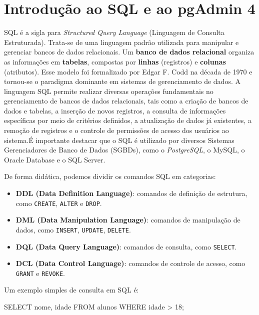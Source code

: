 
\chapter{Introdução ao SQL e ao pgAdmin 4}

SQL é a sigla para \textit{Structured Query Language} (Linguagem de Consulta Estruturada). Trata-se de uma linguagem padrão utilizada para manipular e gerenciar bancos de dados relacionais. Um \textbf{banco de dados relacional} organiza as informações em \textbf{tabelas}, compostas por \textbf{linhas} (registros) e \textbf{colunas} (atributos). Esse modelo foi formalizado por Edgar F. Codd na década de 1970 e tornou-se o paradigma dominante em sistemas de gerenciamento de dados. A linguagem SQL permite realizar diversas operações fundamentais no gerenciamento de bancos de dados relacionais, tais como a criação de bancos de dados e tabelas, a inserção de novos registros, a consulta de informações específicas por meio de critérios definidos, a atualização de dados já existentes, a remoção de registros e o controle de permissões de acesso dos usuários ao sistema.É importante destacar que o SQL é utilizado por diversos Sistemas Gerenciadores de Banco de Dados (SGBDs), como o \textit{PostgreSQL}, o MySQL, o Oracle Database e o SQL Server.

De forma didática, podemos dividir os comandos SQL em categorias:
\begin{itemize}
    \item \textbf{DDL (Data Definition Language)}: comandos de definição de estrutura, como \texttt{CREATE}, \texttt{ALTER} e \texttt{DROP}.
    \item \textbf{DML (Data Manipulation Language)}: comandos de manipulação de dados, como \texttt{INSERT}, \texttt{UPDATE}, \texttt{DELETE}.
    \item \textbf{DQL (Data Query Language)}: comandos de consulta, como \texttt{SELECT}.
    \item \textbf{DCL (Data Control Language)}: comandos de controle de acesso, como \texttt{GRANT} e \texttt{REVOKE}.
\end{itemize}









Um exemplo simples de consulta em SQL é:

\begin{sqlcode}
SELECT nome, idade
FROM alunos
WHERE idade > 18;
\end{sqlcode}

